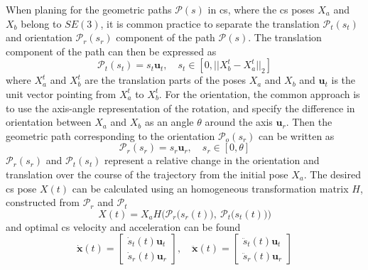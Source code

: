 When planing for the geometric paths $\mathscr{P}(s)$ in \gls{cs}, where the \gls{cs} poses $X_a$ and $X_b$ belong to $SE(3)$, it is common practice to separate the translation $\mathscr{P}_t(s_t)$ and orientation $\mathscr{P}_r(s_r)$ component of the path $\mathscr{P}(s)$\cite{Bobrow1985}. The translation component of the path can then be expressed as
\begin{equation}
    \mathscr{P}_t(s_t) = s_t \bm{u}_t, \quad s_t \in \left[0, ||X_{b}^t - X_{a}^t||_2\right]\label{eq:trans_path}
\end{equation}
where $X_{a}^t$ and $X_{b}^t$ are the translation parts of the poses $X_a$ and $X_b$ and $\bm{u}_t$ is the unit vector pointing from $X_{a}^t$ to $X_{b}^t$. For the orientation, the common approach is to use the axis-angle representation of the rotation, and specify the difference in orientation between $X_a$ and $X_b$ as an angle $\theta$ around the axis $\bm{u}_{r}$. Then the geometric path corresponding to the orientation $\mathscr{P}_o(s_r)$ can be written as
\begin{equation}
    \mathscr{P}_r(s_r) = s_r \bm{u}_{r}, \quad s_r \in \left[0, \theta\right] \label{eq:rot_path}
\end{equation}
$\mathscr{P}_r(s_r)$ and $\mathscr{P}_t(s_t)$ represent a relative change in the orientation and translation over the course of the trajectory from the initial pose $X_a$. The desired \gls{cs} pose $X(t)$ can be calculated using an homogeneous transformation matrix $H$, constructed from $\mathscr{P}_r$ and $\mathscr{P}_t$ 
\begin{equation}
    X(t) = X_a H\Big(\mathscr{P}_r\big(s_r(t)\big), ~\mathscr{P}_t\big(s_t(t)\big)\Big)
\end{equation}
and optimal \gls{cs} velocity and acceleration can be found
\begin{equation}
    \dot{\bm{x}}(t)= \begin{bmatrix}\dot{s}_t(t) \bm{u}_t \\ \dot{s}_r( t) \bm{u}_r\end{bmatrix}, \quad 
    \ddot{\bm{x}}(t)= \begin{bmatrix}\ddot{s}_t(t) \bm{u}_t \\ \ddot{s}_r(t) \bm{u}_r\end{bmatrix}
\end{equation}

